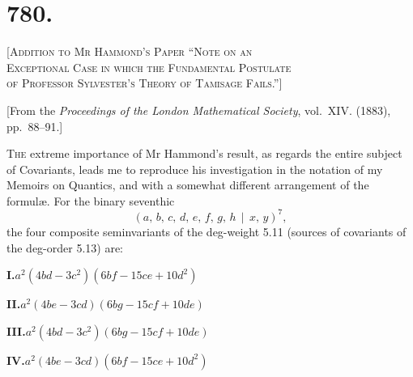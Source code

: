 \documentclass[11pt,a4paper]{book}
\begin{document}
\newpage

\section*{780.}

\begin{center}
\Large\scshape [Addition to Mr Hammond's Paper ``Note on an\\Exceptional Case in which the Fundamental Postulate\\of Professor Sylvester's Theory of Tamisage Fails.'']
\end{center}

\begin{center}
[From the \textit{Proceedings of the London Mathematical Society}, vol.~XIV. (1883), pp.~88--91.]
\end{center}

\textsc{The} extreme importance of Mr Hammond's result, as regards the entire subject of Covariants, leads me to reproduce his investigation in the notation of my Memoirs on Quantics, and with a somewhat different arrangement of the formul\ae. For the binary seventhic
\[
(a,\, b,\, c,\, d,\, e,\, f,\, g,\, h \,\!\!\mid\!\!\, x,\, y)^{7},
\]
the four composite seminvariants of the deg-weight 5.11 (sources of covariants of the deg-order 5.13) are:

\begin{center}
\textbf{I.}\quad $a^{2}(4bd - 3c^{2})(6bf - 15ce + 10d^{2})$
\end{center}

\begin{center}
\textbf{II.}\quad $a^{2}(4be - 3cd)(6bg - 15cf + 10de)$
\end{center}

\begin{center}
\textbf{III.}\quad $a^{2}(4bd - 3c^{2})(6bg - 15cf + 10de)$
\end{center}

\begin{center}
\textbf{IV.}\quad $a^{2}(4be - 3cd)(6bf - 15ce + 10d^{2})$
\end{center}
\end{document}
